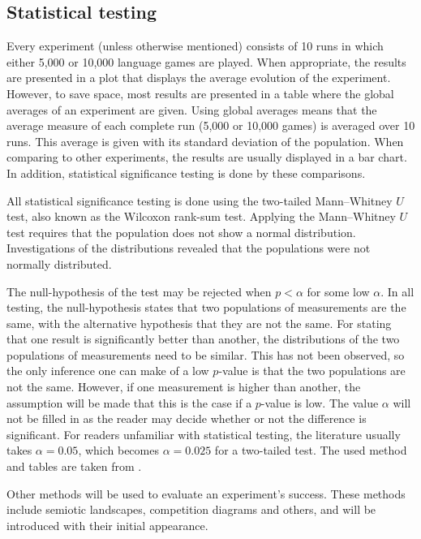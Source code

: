 \subsection{Statistical testing}

Every experiment (unless otherwise mentioned) consists of 10 runs in which either 5,000 or 10,000 language games are played. When appropriate, the results are presented in a plot that displays the average evolution of the experiment. However, to save space, most results are presented in a table where the global averages of an experiment are given. Using global averages means that the average measure of each complete run (5,000 or 10,000 games) is averaged over 10 runs. This average is given with its standard deviation of the population. When comparing to other experiments, the results are usually displayed in a bar chart. In addition, statistical significance testing is done by these comparisons.
	
 All statistical significance testing is done using the two-tailed Mann--Whitney $U$ test, also known as the Wilcoxon rank-sum test. Applying the Mann--Whitney $U$ test requires that the population does not show a normal distribution. Investigations of the distributions revealed that the populations were not normally distributed. 

The null-hypothesis of the test may be rejected when $p<\alpha$ for some low $\alpha$. In all testing, the null-hypothesis states that two populations of measurements are the same, with the alternative hypothesis that they are not the same. For stating that one result is significantly better than another, the distributions of the two populations of measurements need to be similar. This has not been observed, so the only inference one can make of a low $p$-value is that the two populations are not the same. However, if one measurement is higher than another, the assumption will be made that this is the case if a $p$-value is low. The value $\alpha$ will not be filled in as the reader may decide whether or not the difference is significant. For readers unfamiliar with statistical testing, the literature usually takes $\alpha=0.05$, which becomes $\alpha=0.025$ for a two-tailed test. The used method and tables are taken from \citet{aczel:1989}.

Other methods will be used to evaluate an experiment's success.
These methods include semiotic landscapes, competition diagrams and others, and
will be introduced with their initial appearance.

